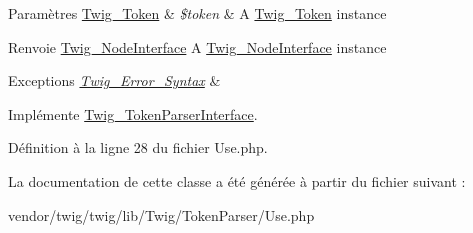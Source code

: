 \begin{DoxyParams}[1]{Paramètres}
\hyperlink{class_twig___token}{Twig\+\_\+\+Token} & {\em \$token} & A \hyperlink{class_twig___token}{Twig\+\_\+\+Token} instance\\
\hline
\end{DoxyParams}
\begin{DoxyReturn}{Renvoie}
\hyperlink{interface_twig___node_interface}{Twig\+\_\+\+Node\+Interface} A \hyperlink{interface_twig___node_interface}{Twig\+\_\+\+Node\+Interface} instance
\end{DoxyReturn}

\begin{DoxyExceptions}{Exceptions}
{\em \hyperlink{class_twig___error___syntax}{Twig\+\_\+\+Error\+\_\+\+Syntax}} & \\
\hline
\end{DoxyExceptions}


Implémente \hyperlink{interface_twig___token_parser_interface_a5dfa2e269321584fb74e8b43dabe0efd}{Twig\+\_\+\+Token\+Parser\+Interface}.



Définition à la ligne 28 du fichier Use.\+php.



La documentation de cette classe a été générée à partir du fichier suivant \+:\begin{DoxyCompactItemize}
\item 
vendor/twig/twig/lib/\+Twig/\+Token\+Parser/Use.\+php\end{DoxyCompactItemize}
